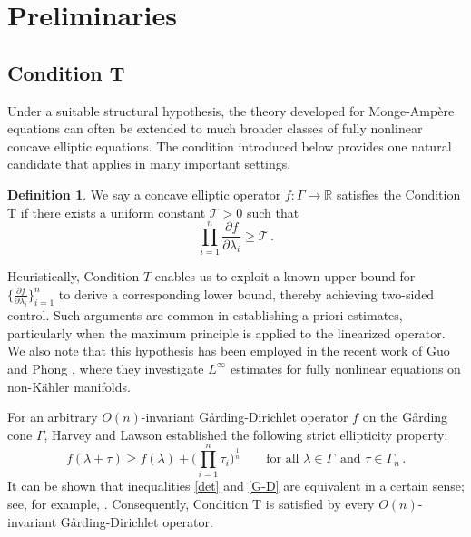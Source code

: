 \documentclass{article}
\theoremstyle{plain}
\theoremstyle{definition}
\theoremstyle{definition}
\newtheorem{definition}[theorem]{Definition}
\numberwithin{equation}{section}
\begin{document}
\begin{sloppypar}
\section{Preliminaries}

\subsection{Condition T}
Under a suitable structural hypothesis, the theory developed for Monge-Amp\`ere equations can often be extended to much broader classes of fully nonlinear concave elliptic equations. The condition introduced below provides one natural candidate that applies in many important settings.
\begin{definition}\label{T}
We say a concave elliptic operator $f: \Gamma \rightarrow \mathbb{R}$ satisfies the Condition T if there exists a uniform  constant  $\mathscr{T}>0$ such that  
\begin{equation}\label{det}
\prod_{i=1}^{n}\frac{\partial f}{\partial \lambda_{i}}\geq  {\mathscr{T}}\,.
\end{equation}  
\end{definition}
Heuristically, Condition $T$ enables us to exploit a known upper bound for $\{\frac{\partial f}{\partial \lambda_{i}}\}_{i=1}^{n}$  to derive a corresponding lower bound, thereby achieving two-sided control. Such arguments are common in establishing a priori estimates, particularly when the maximum principle is applied to the linearized operator. We also note that this hypothesis has been employed in the recent work of Guo and Phong \cite{GP24}, where they investigate $L^{\infty}$ estimates for fully nonlinear equations on non-K\"ahler manifolds. \medskip

For an arbitrary $O(n)$-invariant G\r{a}rding-Dirichlet operator $f$ on the G\r{a}rding cone $\Gamma$, Harvey and Lawson \cite{HL23} established the following strict ellipticity property:
\begin{equation}\label{G-D}
f(\lambda+\tau)\geq f(\lambda)+\Big(\prod_{i=1}^{n}  \tau_i\Big)^{\frac{1}{n}} \qquad \text{for all } \lambda\in \Gamma\, \text{ and } \tau\in \Gamma_{n}\,.
\end{equation}
It can be shown that inequalities \eqref{det} and \eqref{G-D} are equivalent in a certain sense; see, for example, \cite[Lemma 2.4]{Zhang25}.  Consequently, Condition T is satisfied by every $O(n)$-invariant G\r{a}rding-Dirichlet operator. 


\end{sloppypar}
\end{document}
